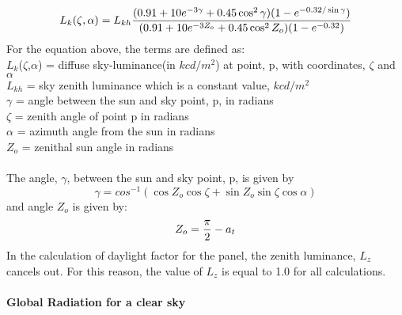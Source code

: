 \documentclass[times, 10pt,a4paper]{article}
\begin{document}
\begin{equation}
L_k(\zeta,\alpha) = L_{kh}{(0.91 + 10e^{-3\gamma} + 0.45\cos^2\gamma)(1-e^{-0.32/\sin\gamma}) \over (0.91 + 10e^{-3Z_o} + 0.45\cos^2Z_o)
(1-e^{-0.32})}
\end{equation}
For the equation above, the terms are defined as:\\
$L_{k}$($\zeta$,$\alpha$) = diffuse sky-luminance(in $kcd/m^2$) at point, p, with coordinates, $\zeta$ and $\alpha$ \\
$L_{kh}$ = sky zenith luminance which is a constant value, $kcd/m^2$ \\
$\gamma$  = angle between the sun and sky point, p, in radians \\
$\zeta$ = zenith angle of point p in radians\\
$\alpha$ = azimuth angle from the sun in radians\\
$Z_o$ = zenithal sun angle in radians\\ \\
The angle, $\gamma$, between the sun and sky point, p, is given by\\
\begin{equation}
\gamma = cos^{-1}(\cos Z_o\cos \zeta + \sin Z_o\sin\zeta\cos\alpha)
\end{equation} 
and angle $Z_o$ is given by:
\begin{equation}
Z_o = {\pi \over 2} - a_t
\end{equation}
In the calculation of daylight factor for the panel, the zenith luminance, $L_z$ cancels out. For this reason, the value of
$L_z$ is equal to 1.0 for all calculations. \\ \\
\textbf{Global Radiation for a clear sky} \\
\end{document}
